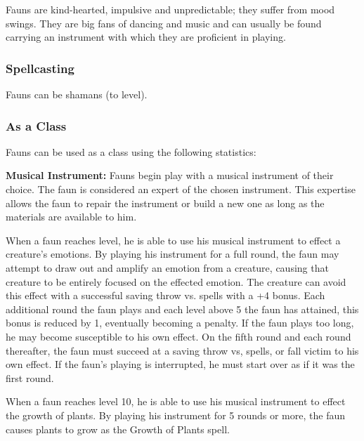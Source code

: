 \begin{multicols*}{2}
Fauns are kind-hearted, impulsive and unpredictable; they suffer from mood swings. They are big fans of dancing and music and can usually be found carrying an instrument with which they are proficient in playing.

\subsubsection{Spellcasting}
Fauns can be shamans (to  level).

\subsubsection{As a Class}
Fauns can be used as a class using the following statistics:

\textbf{Musical Instrument:} Fauns begin play with a musical instrument of their choice. The faun is considered an expert of the chosen instrument. This expertise allows the faun to repair the instrument or build a new one as long as the materials are available to him.

When a faun reaches  level, he is able to use his musical instrument to effect a creature's emotions. By playing his instrument for a full round, the faun may attempt to draw out and amplify an emotion from a creature, causing that creature to be entirely focused on the effected emotion. The creature can avoid this effect with a successful saving throw vs. spells with a +4 bonus. Each additional round the faun plays and each level above 5 the faun has attained, this bonus is reduced by 1, eventually becoming a penalty. If the faun plays too long, he may become susceptible to his own effect. On the fifth round and each round thereafter, the faun must succeed at a saving throw vs, spells, or fall victim to his own effect. If the faun's playing is interrupted, he must start over as if it was the first round.

When a faun reaches level 10, he is able to use his musical instrument to effect the growth of plants. By playing his instrument for 5 rounds or more, the faun causes plants to grow as the Growth of Plants spell.

\end{multicols*}
